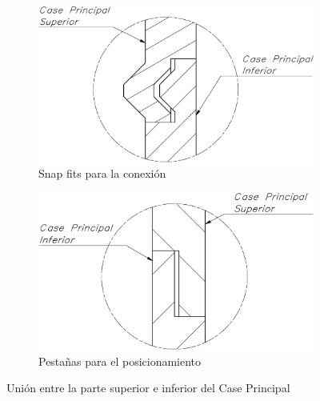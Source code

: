 \vspace{5mm}

\begin{figure}[hbt!]
\centering
\begin{subfigure}{.5\textwidth}
  \centering
  \includegraphics[width=\linewidth]{snap.pdf}
  \caption{Snap fits para la conexión}
  \label{fig:snaps_1}
\end{subfigure}%
\begin{subfigure}{.5\textwidth}
  \centering
  \includegraphics[width=0.9\linewidth]{lid.pdf}
  \caption{Pestañas para el posicionamiento}
  \label{fig:lid_1}
\end{subfigure}
\caption{Unión entre la parte superior e inferior del Case Principal}
\label{fig:union-case_principal}
\end{figure}

